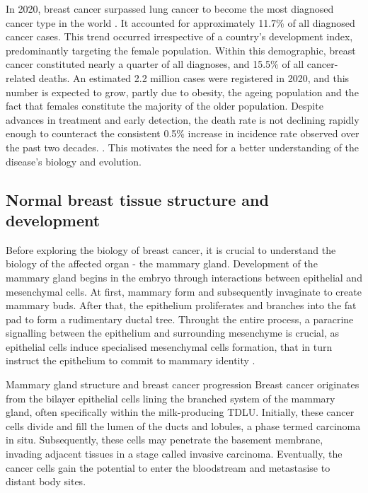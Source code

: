 
In 2020, breast cancer surpassed lung cancer to become the most diagnosed cancer type in the world \parencite{Sung2021-xv}. It accounted for approximately 11.7\% of all diagnosed cancer cases. This trend occurred irrespective of a country's development index, predominantly targeting the female population. Within this demographic, breast cancer constituted nearly a quarter of all diagnoses, and 15.5\% of all cancer-related deaths. An estimated 2.2 million cases were registered in 2020, and this number is expected to grow, partly due to obesity, the ageing population and the fact that females constitute the majority of the older population. Despite advances in treatment and early detection, the death rate is not declining rapidly enough to counteract the consistent 0.5\% increase in incidence rate observed over the past two decades. \parencite{Cronin2022-mc}. This motivates the need for a better understanding of the disease's biology and evolution.

\subsection{Normal breast tissue structure and development}
\label{sec:applications-normal-breast-development}
Before exploring the biology of breast cancer, it is crucial to understand the biology of the affected organ - the mammary gland. Development of the mammary gland begins in the embryo through interactions between epithelial and mesenchymal cells. At first, mammary  form and subsequently invaginate to create mammary buds. After that, the epithelium proliferates and branches into the fat pad to form a rudimentary ductal tree. Throught the entire process, a paracrine signalling between the epithelium and surrounding mesenchyme is crucial, as epithelial cells induce specialised mesenchymal cells formation, that in turn instruct the epithelium to commit to mammary identity \parencite{Macias2012-su,Spina2021-ej}.

    {Mammary gland structure and breast cancer progression}
    {Breast cancer originates from the bilayer epithelial cells lining the branched system of the mammary gland, often specifically within the milk-producing \acf{TDLU}. Initially, these cancer cells divide and fill the lumen of the ducts and lobules, a phase termed carcinoma in situ. Subsequently, these cells may penetrate the basement membrane, invading adjacent tissues in a stage called invasive carcinoma. Eventually, the cancer cells gain the potential to enter the bloodstream and metastasise to distant body sites.}

